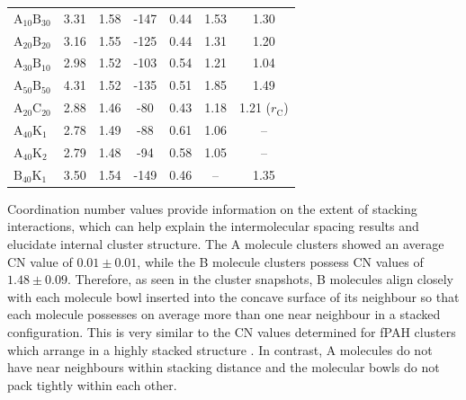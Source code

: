 \begin{table}[ht]
\begin{tabular}{lcccccc}
$\text{A}_{\text{10}}\text{B}_{\text{30}}$ & 3.31 & 1.58 & -147 & 0.44 & 1.53 & 1.30 \\ 
$\text{A}_{\text{20}}\text{B}_{\text{20}}$ & 3.16 & 1.55 & -125 & 0.44 & 1.31 & 1.20 \\
$\text{A}_{\text{30}}\text{B}_{\text{10}}$ & 2.98 & 1.52 & -103 & 0.54 &  1.21 & 1.04 \\
$\text{A}_{\text{50}}\text{B}_{\text{50}}$ & 4.31 & 1.52 & -135 & 0.51 &  1.85 & 1.49 \\ \hline
$\text{A}_{\text{20}}\text{C}_{\text{20}}$ & 2.88 & 1.46 & -80 & 0.43 &  1.18 & 1.21 ($r_{\text{C}}$) \\ \hline
$\text{A}_{\text{40}}\text{K}_{\text{1}}$ & 2.78 & 1.49 & -88 & 0.61 &  1.06 & -- \\
$\text{A}_{\text{40}}\text{K}_{\text{2}}$ & 2.79 & 1.48 & -94 & 0.58 &  1.05 & -- \\ 
$\text{B}_{\text{40}}\text{K}_{\text{1}}$ & 3.50 & 1.54 & -149 & 0.46 &  -- & 1.35 \\ 
\end{tabular}
\end{table}
%

Coordination number values provide information on the extent of stacking interactions, which can help explain the intermolecular spacing results and elucidate internal cluster structure. The A molecule clusters showed an average CN value of $0.01 \pm 0.01$, while the B molecule clusters possess CN values of $1.48 \pm 0.09$. Therefore, as seen in the cluster snapshots, B molecules align closely with each molecule bowl inserted into the concave surface of its neighbour so that each molecule possesses on average more than one near neighbour in a stacked configuration. This is very similar to the CN values determined for fPAH clusters which arrange in a highly stacked structure \cite{bowal2018partitioning}. In contrast, A molecules do not have near neighbours within stacking distance and the molecular bowls do not pack tightly within each other. 
%


